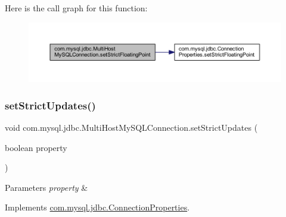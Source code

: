 Here is the call graph for this function\+:
\nopagebreak
\begin{figure}[H]
\begin{center}
\leavevmode
\includegraphics[width=350pt]{classcom_1_1mysql_1_1jdbc_1_1_multi_host_my_s_q_l_connection_a8953dad452ece9ae8a1f2d3cec6ca4ab_cgraph}
\end{center}
\end{figure}
\mbox{\label{classcom_1_1mysql_1_1jdbc_1_1_multi_host_my_s_q_l_connection_ae687926e547ee7430e22ed60f970b1dc}} 
\subsubsection{\texorpdfstring{set\+Strict\+Updates()}{setStrictUpdates()}}
{\footnotesize\ttfamily void com.\+mysql.\+jdbc.\+Multi\+Host\+My\+S\+Q\+L\+Connection.\+set\+Strict\+Updates (\begin{DoxyParamCaption}\item[{boolean}]{property }\end{DoxyParamCaption})}


\begin{DoxyParams}{Parameters}
{\em property} & \\
\hline
\end{DoxyParams}


Implements \mbox{\hyperlink{interfacecom_1_1mysql_1_1jdbc_1_1_connection_properties_a6b1583c38f50feb05d85d5f8357a998c}{com.\+mysql.\+jdbc.\+Connection\+Properties}}.

